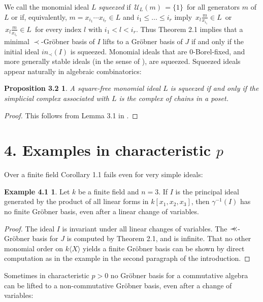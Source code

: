 \documentclass{proc-l}
\theoremstyle{plain}
\newtheorem*{theorem4}{Proposition 3.2}
\theoremstyle{definition}
\newtheorem*{definition1}{Example 4.1}
\newcommand{\precc}{{\prec \kern -5pt\prec }}
\begin{document}
We call the monomial ideal  $L$ {\em squeezed} if
$\, {\mathcal{U}}_{L}(m)\,= \{ 1 \} \,$ for all generators $m $ of $ L$
or if, equivalently, 
$m=x_{i_{1}}\cdots x_{i_{r}}\in L $ and $i_{1}\le \dots \le i_{r}$
imply $\, x_{l}\frac{m}{x_{i_{1}}}\in L \, $
or $\,x_{l}\frac{m}{x_{i_{r}}}\in L \, $
for every index $l$ with $i_{1} < l < i_{r}$.
Thus Theorem 2.1 implies that a minimal $\prec $-Gr\"{o}bner basis 
of $I$ lifts to a Gr\"{o}bner basis 
of $J$ if and only if the initial ideal $in_{\prec }(I)$ is squeezed. 
Monomial ideals that are 0-Borel-fixed, and more generally
stable ideals (in the sense of \cite{EK}), are squeezed. 
Squeezed ideals appear naturally in algebraic combinatorics:

\begin{theorem4}
A square-free monomial ideal $L$ is squeezed if and
only if the simplicial complex
associated with $L$ is the complex 
of chains in a poset.
\end{theorem4}


\begin{proof}
This follows from Lemma 3.1 in \cite{PRS}.
\end{proof}


\section*{4. Examples in characteristic $p$}

Over a finite field Corollary 1.1 fails even for very simple ideals:

\begin{definition1} Let $k$ be a finite field and $n=3$.
If $I$ is the principal ideal generated by the product of all
linear forms in $k[x_{1},x_{2},x_{3}]$, then
$\gamma ^{-1}(I)$ has no finite Gr\"{o}bner basis, even
after a linear change of variables. 
\end{definition1}


\begin{proof}
The ideal $I$ is invariant under all linear changes of variables.
The $\precc $-Gr\"{o}bner basis for $J$ is computed by Theorem 2.1,
and is infinite. That no other monomial
order on $k \langle X \rangle $ yields a finite
Gr\"{o}bner basis can be shown by direct computation as in the example
in the second paragraph of the introduction.
\end{proof}


Sometimes in characteristic $p>0$ no Gr\"{o}bner basis for a commutative algebra
can be lifted to a
non-commutative  Gr\"{o}bner basis, even after a change of variables:
\end{document}
